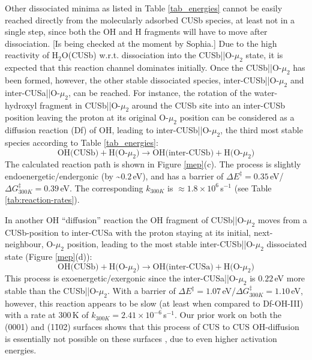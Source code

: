 \documentclass[twoside,twocolumn,9pt]{article}
\begin{document}
{\color{red}Other dissociated minima as listed in 
 Table \ref{tab_energies} cannot be easily reached directly from 
 the molecularly adsorbed CUSb species, at least not in a single 
 step, since both the OH and H fragments will have to move after 
 dissociation.} 
 {\color{green}[Is being checked at the moment by Sophia.]} 
Due to the high reactivity 
 of H$_2$O(CUSb) w.r.t. dissociation 
 into the CUSb||O-$\mu_2$ state, it is expected 
 that this reaction channel dominates initially.
 Once the CUSb||O-$\mu_2$ has been formed, however,
 the other stable dissociated species, 
 inter-CUSb||O-$\mu_2$ and inter-CUSa||O-$\mu_2$, can 
 be reached.
 For instance,
 the rotation of the water-hydroxyl fragment in CUSb||O-$\mu_2$ around the CUSb site into an inter-CUSb position leaving the proton at its original O-$\mu_2$ position can be considered as a 
 diffusion reaction (Df) of OH, leading to inter-CUSb||O-$\mu_2$, the third most 
 stable species according to Table \ref{tab_energies}:
 \begin{equation}
 \text{OH(CUSb)} + \text{H(O-$\mu_2$)}
  \rightarrow \text{OH(inter-CUSb)} + \text{H(O-$\mu_2$)} \tag{Df-OH-III}
  \label{diffOH3}
\end{equation}
The calculated reaction path is shown in Figure \ref{mep}(c). 
 The process is slightly endoenergetic/endergonic (by \textasciitilde$0.2\,$eV), and has a barrier of 
 $\Delta E^\ddagger=0.35\,$eV/$\Delta G^\ddagger_{300K}=0.39\,$eV. The corresponding $k_{300K}$ is $\approx 1.8\times 10^6\,$s$^{-1}$ (see Table \ref{tab:reaction-rates}).

In another OH ``diffusion'' reaction the 
  OH fragment of CUSb||O-$\mu_2$ moves from a CUSb-position to inter-CUSa with the proton staying at its initial, next-neighbour, 
 O-$\mu_2$ position,
  leading to the most stable  inter-CUSb||O-$\mu_2$ dissociated 
 state (Figure \ref{mep}(d)):
 \begin{equation}
 \text{OH(CUSb)} + \text{H(O-$\mu_2$)}
  \rightarrow \text{OH(inter-CUSa)} + \text{H(O-$\mu_2$)} \tag{Df-OH-IV}
    \label{diffOH4}
\end{equation}
This process is exoenergetic/exergonic since the inter-CUSa||O-$\mu_2$ is $0.22$\,eV more stable than the CUSb||O-$\mu_2$. 
With a barrier of $\Delta E^\ddagger=1.07\,$eV/$\Delta G^\ddagger_{300K}=1.10\,$eV, however, 
  this reaction appears to be 
 slow (at least when compared to Df-OH-III) with a rate at $300\,$K of $k_{300K}=2.41\times 10^{-6}\,$s$^{-1}$. 
 Our prior work on both the (0001) and (1\=102) surfaces shows that this process of CUS to CUS OH-diffusion is essentially 
 not possible on these surfaces \cite{kirsch2014,wirth2016characterization}, due to even  higher 
 activation energies.
\end{document}
